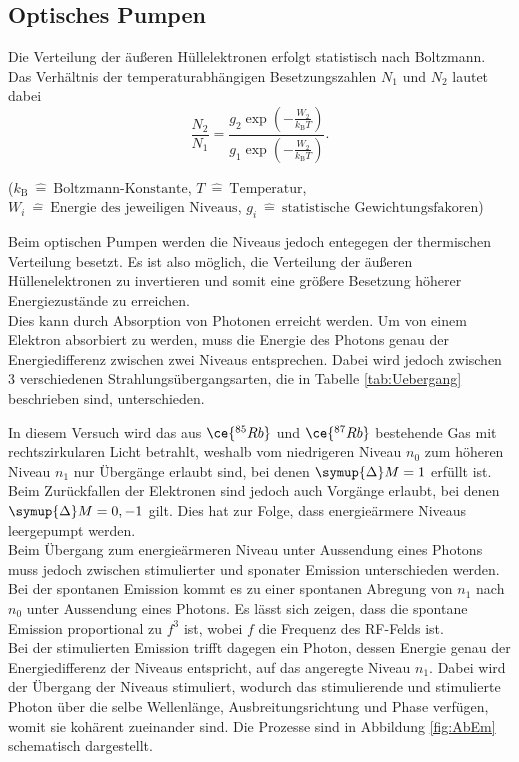 \subsection{Optisches Pumpen} \label{sec:OP}
Die Verteilung der äußeren Hüllelektronen erfolgt statistisch nach Boltzmann. Das Verhältnis der temperaturabhängigen Besetzungszahlen $ N_\text{1} $ und $ N_\text{2} $ lautet dabei
\begin{equation}
  \frac{N_2}{N_1} = \frac{g_2 \exp{\left( - \frac{W_2}{k_\text{B} T} \right)} } { g_1 \exp{\left( - \frac{W_2}{k_\text{B} T} \right) } } .
\end{equation}
\begin{center}
  \tiny{($k_\text{B} \: \hat{=} \: \text{Boltzmann-Konstante}$, $T \: \hat{=} \: \text{Temperatur}$, $W_i \: \hat{=} \: \text{Energie des jeweiligen Niveaus}$, $g_i \: \hat{=} \: \text{statistische Gewichtungsfakoren}$)}
\end{center}

Beim optischen Pumpen werden die Niveaus jedoch entegegen der thermischen Verteilung besetzt. Es ist also möglich, die Verteilung der äußeren Hüllenelektronen zu invertieren und somit eine größere Besetzung höherer Energiezustände zu erreichen. \\
Dies kann durch Absorption von Photonen erreicht werden. Um von einem Elektron absorbiert zu werden, muss die Energie des Photons genau der Energiedifferenz zwischen zwei Niveaus entsprechen. Dabei wird jedoch zwischen 3 verschiedenen Strahlungsübergangsarten, die in Tabelle \ref{tab:Uebergang} beschrieben sind, unterschieden.

In diesem Versuch wird das aus $\ce{^{85}Rb}$ und $\ce{^{87}Rb}$ bestehende Gas mit rechtszirkularen Licht betrahlt, weshalb vom niedrigeren Niveau $n_0$ zum höheren Niveau $n_1$ nur Übergänge erlaubt sind, bei denen $\symup{\Delta} M = 1 $ erfüllt ist. Beim Zurückfallen der Elektronen sind jedoch auch Vorgänge erlaubt, bei denen $\symup{\Delta} M = 0, -1 $ gilt. Dies hat zur Folge, dass energieärmere Niveaus leergepumpt werden.
\\
Beim Übergang zum energieärmeren Niveau unter Aussendung eines Photons muss jedoch zwischen stimulierter und sponater Emission unterschieden werden. \\
Bei der spontanen Emission kommt es zu einer spontanen Abregung von $n_1$ nach $n_0$ unter Aussendung eines Photons. Es lässt sich zeigen, dass die spontane Emission proportional zu $f^3$ ist, wobei $f$ die Frequenz des RF-Felds ist. \\
Bei der stimulierten Emission trifft dagegen ein Photon, dessen Energie genau der Energiedifferenz der Niveaus entspricht, auf das angeregte Niveau $n_1$. Dabei wird der Übergang der Niveaus stimuliert, wodurch das stimulierende und stimulierte Photon über die selbe Wellenlänge, Ausbreitungsrichtung und Phase verfügen, womit sie kohärent zueinander sind.
Die Prozesse sind in Abbildung \ref{fig:AbEm} schematisch dargestellt.

